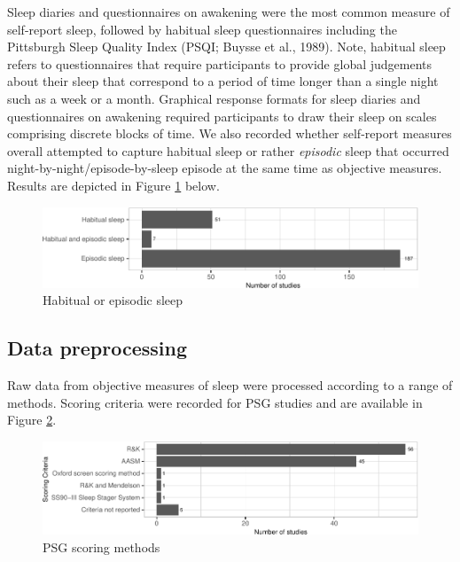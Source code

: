 \documentclass[
]{article}
\begin{document}
Sleep diaries and questionnaires on awakening were the most common measure of self-report sleep, followed by habitual sleep questionnaires including the Pittsburgh Sleep Quality Index (PSQI; Buysse et al., 1989). Note, habitual sleep refers to questionnaires that require participants to provide global judgements about their sleep that correspond to a period of time longer than a single night such as a week or a month. Graphical response formats for sleep diaries and questionnaires on awakening required participants to draw their sleep on scales comprising discrete blocks of time. We also recorded whether self-report measures overall attempted to capture habitual sleep or rather \emph{episodic} sleep that occurred night-by-night/episode-by-sleep episode at the same time as objective measures. Results are depicted in Figure \ref{fig:habitual} below.

\begin{figure}
\centering
\includegraphics{review_markdown_files/figure-latex/habitual-1.pdf}
\caption{\label{fig:habitual}Habitual or episodic sleep}
\end{figure}

\subsection{Data preprocessing}\label{data-preprocessing}

Raw data from objective measures of sleep were processed according to a range of methods. Scoring criteria were recorded for PSG studies and are available in Figure \ref{fig:scoring}.

\begin{figure}
\centering
\includegraphics{review_markdown_files/figure-latex/scoring-1.pdf}
\caption{\label{fig:scoring}PSG scoring methods}
\end{figure}
\end{document}
